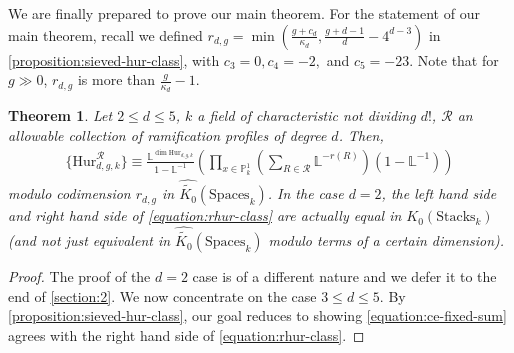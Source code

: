 \documentclass[12 pt]{amsart}
\theoremstyle{plain}
\newtheorem{theorem}[subsection]{Theorem}
\theoremstyle{definition}
\theoremstyle{remark}
\numberwithin{equation}{section}
\newcommand\bl{\mathbb L}
\newcommand\bp{\mathbb P}
\newcommand\hur[3]{\mathrm{Hur}_{#1,#2,#3}} %
\newcommand\rhur[4]{\mathrm{Hur}_{#1,#2,#3}^{#4}} %
\newcommand\codimbound[2]{r_{#1,#2}} %
\newcommand\grcSpaces{\widehat{\widetilde{K_0}}(\mathrm{Spaces}_k)} %
\newcommand\grStacks{K_0(\mathrm{Stacks}_k)} %
\begin{document}
We are finally prepared to prove our main theorem.
For the statement of our main theorem, recall we defined
$\codimbound d g = \min(\frac{g + c_d}{\kappa_d}, \frac{g + d-1}{d} - 4^{d-3})$
in \autoref{proposition:sieved-hur-class}, with $c_3 = 0, c_4 = -2,$ and $c_5 =
-23$.
Note that for $g \gg 0$, $\codimbound d g$ is more than
$\frac{g}{\kappa_d}-1$.

\begin{theorem} \label{theorem:hurwitz-class} Let $2 \leq d \leq 5$, $k$ a field
	of characteristic not dividing $d!$, $\mathcal R$ an allowable
	collection of ramification profiles of degree $d$. Then, \begin{align}
		\label{equation:rhur-class} \{\rhur d g k{\mathcal R}\} \equiv
		\frac{\bl^{\dim{\hur d g k}}}{1-\bl^{-1}} \left( \prod_{x \in
		\bp^1_k} \left( \sum_{R \in \mathcal R} \bl^{-r(R)} \right)
	\left( 1-\bl^{-1} \right) \right) 
\end{align} 
modulo codimension
$\codimbound d g$ 
in
$\grcSpaces$.  
In the case $d = 2$, the left hand
side and right hand side of \eqref{equation:rhur-class} are actually equal in
$\grStacks$ (and not just equivalent in $\grcSpaces$ modulo terms of a certain
dimension).  \end{theorem} \begin{proof} The proof of the $d = 2$ case is of a
	different   nature and we defer it to the end of \autoref{section:2}.
	We now concentrate on the case $3 \leq d \leq 5$.  By
	\autoref{proposition:sieved-hur-class}, our goal reduces to showing
	\eqref{equation:ce-fixed-sum} agrees with the right hand side of
	\eqref{equation:rhur-class}.


\end{proof}
\end{document}
